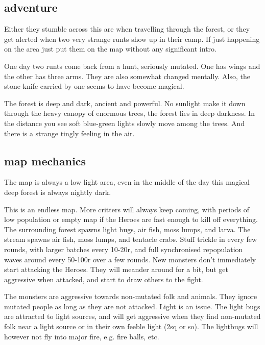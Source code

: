 \subsection*{adventure}

Either they stumble across this are when travelling through the forest, or they get alerted when two very strange runts show up in their camp. If just happening on the area just put them on the map without any significant intro.

One day two runts come back from a hunt, seriously mutated. One has wings and the other has three arms. They are also somewhat changed mentally. Also, the stone knife carried by one seems to have become magical.

\begin{readoutloud}
The forest is deep and dark, ancient and powerful. No sunlight make it down through the heavy canopy of enormous trees, the forest lies in deep darkness. In the distance you see soft blue-green lights slowly move among the trees. And there is a strange tingly feeling in the air.
\end{readoutloud}



\subsection*{map mechanics}

The map is always a low light area, even in the middle of the day this magical deep forest is always nightly dark.

This is an endless map. More critters will always keep coming, with periods of low population or empty map if the Heroes are fast enough to kill off everything. The surrounding forest spawns light bugs, air fish, moss lumps, and larva. The stream spawns air fish, moss lumps, and tentacle crabs. Stuff trickle in every few rounds, with larger batches every 10-20r, and full synchronised repopulation waves around every 50-100r over a few rounds. New monsters don't immediately start attacking the Heroes. They will meander around for a bit, but get aggressive when attacked, and start to draw others to the fight.

The monsters are aggressive towards non-mutated folk and animals. They ignore mutated people as long as they are not attacked.
Light is an issue. The light bugs are attracted to light sources, and will get aggressive when they find non-mutated folk near a light source or in their own feeble light (2sq or so). The lightbugs will however not fly into major fire, e.g. fire balls, etc.

